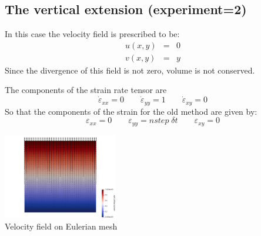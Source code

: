 \newpage
\subsection*{The vertical extension (experiment=2)} 

In this case the velocity field is prescribed to be:
\begin{eqnarray}
u(x,y)&=&0 \\
v(x,y)&=&y
\end{eqnarray}
Since the divergence of this field is not zero, volume is not conserved.

The components of the strain rate tensor are
\[
\dot\varepsilon_{xx} = 0 
\qquad
\dot\varepsilon_{yy} = 1
\qquad
\dot\varepsilon_{xy} = 0 
\]
So that the components of the strain for the old method are given by:
\[
\varepsilon_{xx} = 0 
\qquad
\varepsilon_{yy} = nstep \; \delta t
\qquad
\varepsilon_{xy} = 0 
\]



\begin{center}
\includegraphics[width=5cm]{python_codes/fieldstone_89/results/vertical/vel}\\
{\captionfont Velocity field on Eulerian mesh}
\end{center}


